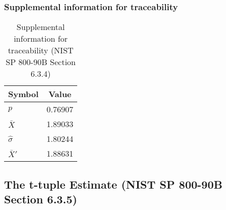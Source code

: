 \documentclass[a3paper,xelatex,english]{bxjsarticle}
\begin{document}
\subsubsection{Supplemental information for traceability}
\renewcommand{\arraystretch}{1.8}
\begin{table}[h]
\caption{Supplemental information for traceability (NIST SP 800-90B Section 6.3.4)}
\begin{center}
\begin{tabular}{|l|c|}
\hline 
\rowcolor{anotherlightblue} %
Symbol				& Value \\ \hline 
$p$				&  0.76907\\ \hline 
$\bar{X}$ 		&  1.89033\\ \hline
$\hat{\sigma}$		&  1.80244\\ \hline
$\bar{X}'$ 		&  1.88631\\ \hline
\end{tabular}
\end{center}
\end{table}
\renewcommand{\arraystretch}{1.4}
\clearpage
\subsection{The t-tuple Estimate (NIST SP 800-90B Section 6.3.5)}\label{sec:Binary635}
\end{document}
